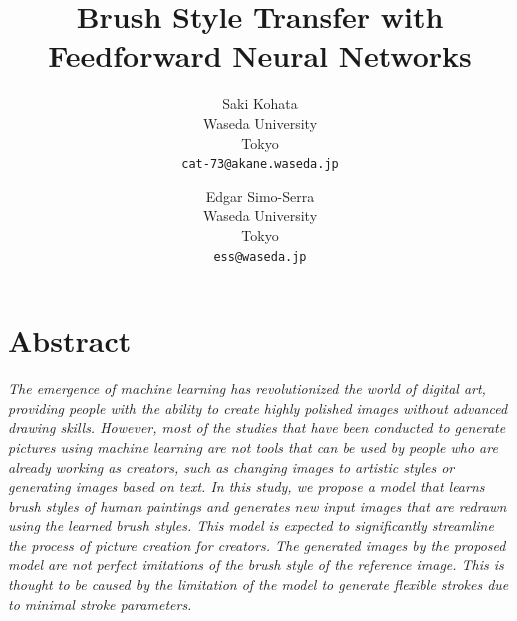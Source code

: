 \documentclass{mva_style}
\begin{document}
\title{Brush Style Transfer with Feedforward Neural Networks}

\author{
  Saki Kohata\\
  Waseda University\\
  Tokyo\\
  {\tt cat-73@akane.waseda.jp}\\
  \and
  Edgar Simo-Serra\\
  Waseda University\\
  Tokyo\\
  {\tt ess@waseda.jp}\\
}

\maketitle

\section*{\centering Abstract}
\textit{
  The emergence of machine learning has revolutionized the world of digital 
  art, providing people with the ability to create highly polished images 
  without advanced drawing skills. 
  However, most of the studies that have been conducted to generate pictures 
  using machine learning are not tools that can be used by people who are 
  already working as creators, such as changing images to artistic styles or 
  generating images based on text. In this study, we propose a model that 
  learns brush styles of human paintings and generates new input images that 
  are redrawn using the learned brush styles. This model is expected to 
  significantly streamline the process of picture creation for creators.
  The generated images by the proposed model are not perfect imitations of 
  the brush style of the reference image. This is thought to be caused by 
  the limitation of the model to generate flexible strokes due to minimal 
  stroke parameters.
}
\end{document}
